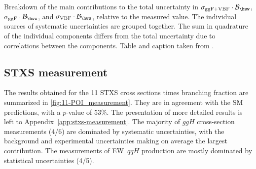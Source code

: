 \begin{table}[ht]
  \centering
  \caption[Breakdown of uncertainties in the inclusive cross-section measurement.]{
    Breakdown of the main contributions to the total uncertainty in $\sigma_{\mathrm{ggF+VBF}} \cdot \mathcal{B}_{\hww}$, $\sigma_{\mathrm{ggF}} \cdot \mathcal{B}_{\hww}$, and $\sigma_{\mathrm{VBF}} \cdot \mathcal{B}_{\hww}$, relative to the measured value.
    The individual sources of systematic uncertainties are grouped together.
    The sum in quadrature of the individual components differs from the total uncertainty due to correlations between the components.
    Table and caption taken from .
  }
  \resizebox{\textwidth}{!}{
    
  }
  \label{tab:UncertaintyBreakdown_2-POI}
\end{table}

\subsection{STXS measurement}
The results obtained for the 11 STXS cross sections times branching fraction are summarized in \cref{fig:11-POI_measurement}. 
They are in agreement with the SM predictions, with a $p$-value of 53\%.
The presentation of more detailed results is left to Appendix~\ref{app:stxs-measurement}. 
The majority of $ggH$ cross-section measurements (4/6) are dominated by systematic uncertainties, with the background and experimental uncertainties making on average the largest contribution. 
The measurements of EW~$qqH$ production are mostly dominated by statistical uncertainties (4/5). 


